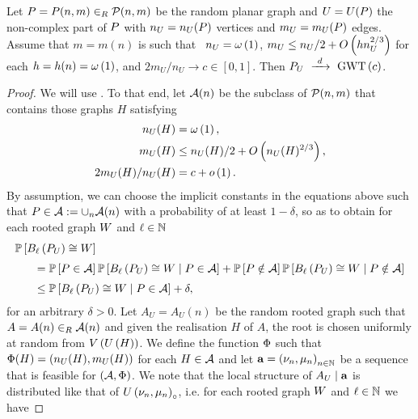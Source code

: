 \begin{lem}\label{LSlem:local_non_complex}
Let $P=P(n,m)\in_R\mathcal{P}(n,m)$ be the random planar graph and $U=U(P)$ the non-complex part of $P$ with  $n_U=n_U(P)$ vertices and $m_U=m_U(P)$ edges. Assume that $m=m(n)$ is such that \whp\ $n_U=\omega\left(1\right)$, $m_U\leq n_U/2+O\left(hn_U^{2/3}\right)$ for each $h=h(n)=\omega\left(1\right)$, and $2m_U/n_U\to c\in [0,1]$. Then $P_U~\xrightarrow{~d~}~\operatorname{GWT}\left(c\right)$.
\end{lem}
\begin{proof}
We will use . To that end, let $\mathcal{A}(n)$ be the subclass of $\mathcal{P}(n,m)$ that contains those graphs $H$ satisfying
\begin{align*}
n_U(H)&=\omega\left(1\right),\\
m_U(H)&\leq n_U(H)/2+O\left(n_U(H)^{2/3}\right),\\
2m_U(H)/n_U(H)&=c+o\left(1\right).
\end{align*}
By assumption, we can choose the implicit constants in the equations above such that $P\in\mathcal{A}:=\cup_n\mathcal{A}(n)$ with a probability of at least $1-\delta$, so as to obtain for each rooted graph $W$ and $\ell\in\mathbb{N}$
\begin{align}\label{LSeq:10}
&\mathbb{P}\left[B_{\ell}\left(P_U\right)\cong W\right]
\nonumber
\\[0.1cm]
&~~~~~=\mathbb{P}\left[P\in\mathcal{A}\right]\mathbb{P}\left[B_{\ell}\left(P_U\right)\cong W \;\middle|\; P\in\mathcal{A}\right]+\mathbb{P}\left[P\notin\mathcal{A}\right]\mathbb{P}\left[B_{\ell}\left(P_U\right)\cong W \;\middle|\; P\notin\mathcal{A}\right]\nonumber
\\[0.1cm]
&~~~~~\leq
\mathbb{P}\left[B_{\ell}\left(P_U\right)\cong W \;\middle|\; P\in\mathcal{A}\right]+\delta,
\end{align}
for an arbitrary $\delta>0$. Let $A_U=A_U(n)$ be the random rooted graph such that $A=A(n)\in_R\mathcal{A}(n)$ and given the realisation $H$ of $A$, the root is chosen uniformly at random from $V\left(U\left(H\right)\right)$. We define the function $\Phi$ such that $\Phi(H)=\left(n_U(H), m_U(H)\right)$ for each $H\in\mathcal{A}$ and let $\mathbf{a}=\left(\nu_n, \mu_n\right)_{n\in\mathbb{N}}$ be a sequence that is feasible for $(\mathcal{A}, \Phi)$. We note that the local structure of $A_U \mid \mathbf{a}$ is distributed like that of $U\left(\nu_n, \mu_n\right)_\circ$, i.e. for each rooted graph $W$ and $\ell\in\mathbb{N}$ we have 

\end{proof}

